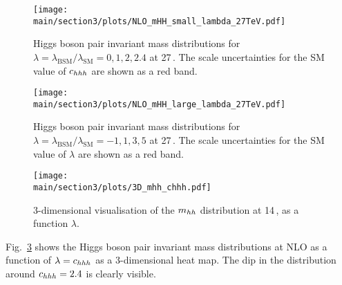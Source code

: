 \begin{figure}[htb]
  \centering
    \texttt{[image: \\main/section3/plots/NLO\_mHH\_small\_lambda\_27TeV.pdf]}
\caption{Higgs boson pair invariant mass distributions for $\lambda=\lambda_{\mathrm{BSM}}/\lambda_{\mathrm{SM}}=0,1,2,2.4$  at 27\,\UTeV. The scale uncertainties for the SM value of $c_{hhh}$ are shown as a red band.}
\label{fig:lambda_small_27}
\end{figure}

\begin{figure}[htb]
  \centering
    \texttt{[image: \\main/section3/plots/NLO\_mHH\_large\_lambda\_27TeV.pdf]}
\caption{Higgs boson pair invariant mass distributions for $\lambda=\lambda_{\mathrm{BSM}}/\lambda_{\mathrm{SM}}=-1,1,3,5$  at 27\,\UTeV. The scale uncertainties for the SM value of $\lambda$ are shown as a red band.}
\label{fig:lambda_large_27}
\end{figure}

\begin{figure}[ht]
\begin{center}
  \texttt{[image: \\main/section3/plots/3D\_mhh\_chhh.pdf]}    
\end{center}
\caption{3-dimensional visualisation of the $m_{hh}$ distribution at
  14\,\UTeV, as a function  $\lambda$.}
\label{fig:chhh_3D}
\end{figure}
Fig.~\ref{fig:chhh_3D} shows the Higgs boson pair invariant mass
distributions at NLO as a function of $\lambda=c_{hhh}$  as a 3-dimensional heat map.
The dip in the distribution around $c_{hhh}=2.4$ is clearly visible.
 
%


